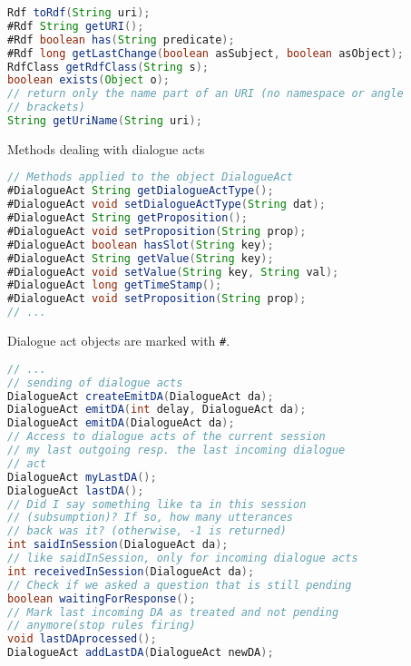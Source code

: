 \documentclass[5pt]{article}
\begin{document}
\begin{multicols}{2}
\begin{bodybox}{}
\begin{lstlisting}[language=Java]
Rdf toRdf(String uri);
#Rdf String getURI();
#Rdf boolean has(String predicate);
#Rdf long getLastChange(boolean asSubject, boolean asObject);
RdfClass getRdfClass(String s);
boolean exists(Object o);
// return only the name part of an URI (no namespace or angle
// brackets)
String getUriName(String uri);
        \end{lstlisting}
        Methods dealing with dialogue acts
        \begin{lstlisting}[language=Java]
// Methods applied to the object DialogueAct
#DialogueAct String getDialogueActType();
#DialogueAct void setDialogueActType(String dat);
#DialogueAct String getProposition();
#DialogueAct void setProposition(String prop);
#DialogueAct boolean hasSlot(String key);
#DialogueAct String getValue(String key);
#DialogueAct void setValue(String key, String val);
#DialogueAct long getTimeStamp();
#DialogueAct void setProposition(String prop);
// ...
        \end{lstlisting}
        Dialogue act objects are marked with \verb|#|.
        \begin{lstlisting}[language=Java]
// ...
// sending of dialogue acts
DialogueAct createEmitDA(DialogueAct da);
DialogueAct emitDA(int delay, DialogueAct da);
DialogueAct emitDA(DialogueAct da);
// Access to dialogue acts of the current session
// my last outgoing resp. the last incoming dialogue
// act
DialogueAct myLastDA();
DialogueAct lastDA();
// Did I say something like ta in this session
// (subsumption)? If so, how many utterances 
// back was it? (otherwise, -1 is returned)
int saidInSession(DialogueAct da);
// like saidInSession, only for incoming dialogue acts
int receivedInSession(DialogueAct da);
// Check if we asked a question that is still pending
boolean waitingForResponse();
// Mark last incoming DA as treated and not pending
// anymore(stop rules firing)
void lastDAprocessed();
DialogueAct addLastDA(DialogueAct newDA);
        \end{lstlisting}
        \end{bodybox}
    \end{multicols}
\end{document}
